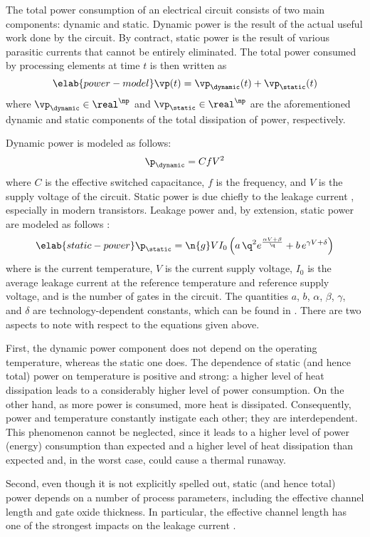 The total power consumption of an electrical circuit consists of two main
components: dynamic and static. Dynamic power is the result of the actual useful
work done by the circuit. By contract, static power is the result of various
parasitic currents that cannot be entirely eliminated. The total power consumed
by \np processing elements at time $t$ is then written as
\begin{equation} \elab{power-model}
  \vp(t) = \vp_\dynamic(t) + \vp_\static(t)
\end{equation}
where $\vp_\dynamic \in \real^\np$ and $\vp_\static \in \real^\np$ are the
aforementioned dynamic and static components of the total dissipation of power,
respectively.

Dynamic power is modeled as follows:
\[
  \p_\dynamic = C f V^2
\]
where $C$ is the effective switched capacitance, $f$ is the frequency, and $V$
is the supply voltage of the circuit. Static power is due chiefly to the leakage
current \cite{chandrakasan2000, srivastava2010, juan2011, juan2012}, especially
in modern  transistors. Leakage power and, by extension, static power
are modeled as follows \cite{liao2005}:
\begin{equation} \elab{static-power}
  \p_\static = \n{g} V I_0 \left(a \, \q^2 e^{\frac{\alpha V + \beta}{\q}} + b \, e^{\gamma V + \delta}\right)
\end{equation}
where \q is the current temperature, $V$ is the current supply voltage, $I_0$ is
the average leakage current at the reference temperature and reference supply
voltage, and  is the number of gates in the circuit. The quantities $a$,
$b$, $\alpha$, $\beta$, $\gamma$, and $\delta$ are technology-dependent
constants, which can be found in \cite{liao2005}. There are two aspects to note
with respect to the equations given above.

First, the dynamic power component does not depend on the operating temperature,
whereas the static one does. The dependence of static (and hence total) power on
temperature is positive and strong: a higher level of heat dissipation leads to
a considerably higher level of power consumption. On the other hand, as more
power is consumed, more heat is dissipated. Consequently, power and temperature
constantly instigate each other; they are interdependent. This phenomenon cannot
be neglected, since it leads to a higher level of power (energy) consumption
than expected and a higher level of heat dissipation than expected and, in the
worst case, could cause a thermal runaway.

Second, even though it is not explicitly spelled out, static (and hence total)
power depends on a number of process parameters, including the effective channel
length and gate oxide thickness. In particular, the effective channel length has
one of the strongest impacts on the leakage current \cite{juan2012}.
